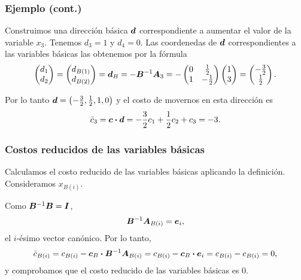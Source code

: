 \documentclass[aspectratio=169,12pt,spanish]{beamer}
\begin{document}
\begin{frame}
\frametitle{Ejemplo (cont.)}

Construimos una dirección básica $\bm{d}$ correspondiente a aumentar el valor de la variable $x_3$. Tenemos $d_3 = 1$ y $d_4 = 0$. Las coordenedas de $\bm{d}$ correspondientes a las variables básicas las obtenemos por la fórmula
$$
\begin{pmatrix} d_1 \\ d_2 \end{pmatrix} =
\begin{pmatrix} d_{B(1)} \\ d_{B(2)} \end{pmatrix} =
\bm{d}_B = -\bm{B}^{-1} \bm{A}_3 =
-\begin{pmatrix} 0 & \frac{1}{2} \\ 1 & -\frac{1}{2} \end{pmatrix}
\begin{pmatrix} 1 \\ 3 \end{pmatrix} =
\begin{pmatrix} -\frac{3}{2} \\ \frac{1}{2} \end{pmatrix}.
$$

Por lo tanto $\bm{d} = \left(-\frac{3}{2}, \frac{1}{2}, 1, 0 \right)$ y el costo de movernos en esta dirección es
$$\bar c_3 = \bm{c} \boldsymbol{\cdot} \bm{d} = -\frac{3}{2} c_1 + \frac{1}{2}c_2 + c_3 = -3.$$


\end{frame}


\begin{frame}
\frametitle{Costos reducidos de las variables básicas}

Calculamos el costo reducido de las variables básicas aplicando la definición. Consideramos $x_{B(i)}$.

Como $\bm{B}^{-1} \bm{B} = \bm{I}$, 
$$\bm{B}^{-1} \bm{A}_{B(i)} = \bm{e}_i,$$
el $i$-ésimo vector canónico. Por lo tanto, 
$$
\bar c_{B(i)} = c_{B(i)} - \bm{c}_B \boldsymbol{\cdot} \bm{B}^{-1} \bm{A}_{B(i)} = c_{B(i)} - \bm{c}_B \boldsymbol{\cdot} \bm{e}_i = c_{B(i)} - c_{B(i)} = 0,
$$
y comprobamos que el costo reducido de las variables básicas es 0.


\end{frame}



\end{document}
